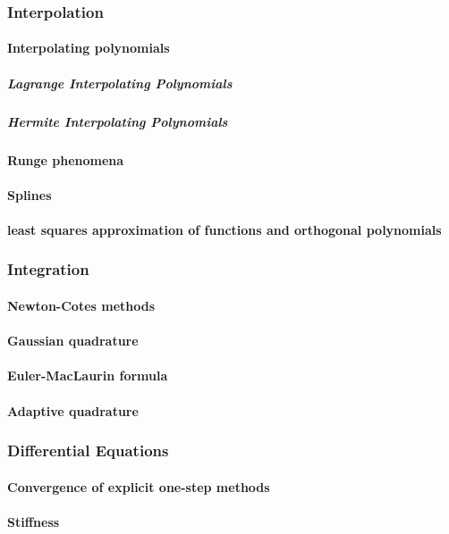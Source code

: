 \documentclass[a4paper,12pt]{article} %
\begin{document}
\subsubsection{Interpolation}
\paragraph{Interpolating polynomials}
\subparagraph{Lagrange Interpolating Polynomials}
\subparagraph{Hermite Interpolating Polynomials}
\paragraph{Runge phenomena}
\paragraph{Splines}
\paragraph{least squares approximation of functions and orthogonal polynomials}

\subsubsection{Integration}
\paragraph{Newton-Cotes methods}
\paragraph{Gaussian quadrature}
\paragraph{Euler-MacLaurin formula}
\paragraph{Adaptive quadrature}

\subsubsection{Differential Equations}
\paragraph{Convergence of explicit one-step methods}
\paragraph{Stiffness}
\end{document}
